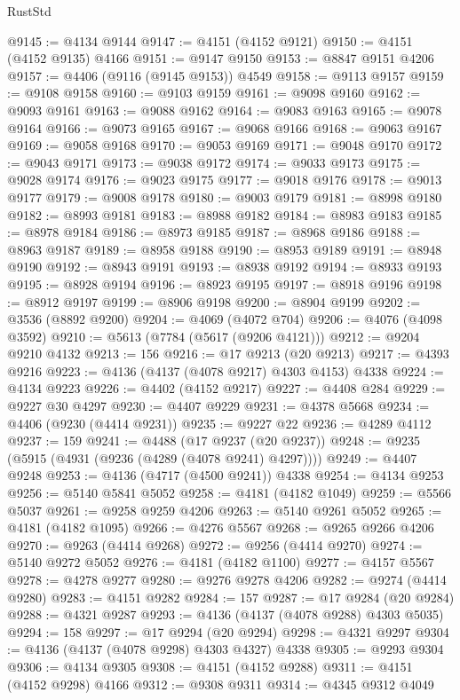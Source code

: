 \begin{lexlean}{RustStd}
\begin{coremodule}
@9145 := @4134 @9144
@9147 := @4151 (@4152 @9121)
@9150 := @4151 (@4152 @9135) @4166
@9151 := @9147 @9150
@9153 := @8847 @9151 @4206
@9157 := @4406 (@9116 (@9145 @9153)) @4549
@9158 := @9113 @9157
@9159 := @9108 @9158
@9160 := @9103 @9159
@9161 := @9098 @9160
@9162 := @9093 @9161
@9163 := @9088 @9162
@9164 := @9083 @9163
@9165 := @9078 @9164
@9166 := @9073 @9165
@9167 := @9068 @9166
@9168 := @9063 @9167
@9169 := @9058 @9168
@9170 := @9053 @9169
@9171 := @9048 @9170
@9172 := @9043 @9171
@9173 := @9038 @9172
@9174 := @9033 @9173
@9175 := @9028 @9174
@9176 := @9023 @9175
@9177 := @9018 @9176
@9178 := @9013 @9177
@9179 := @9008 @9178
@9180 := @9003 @9179
@9181 := @8998 @9180
@9182 := @8993 @9181
@9183 := @8988 @9182
@9184 := @8983 @9183
@9185 := @8978 @9184
@9186 := @8973 @9185
@9187 := @8968 @9186
@9188 := @8963 @9187
@9189 := @8958 @9188
@9190 := @8953 @9189
@9191 := @8948 @9190
@9192 := @8943 @9191
@9193 := @8938 @9192
@9194 := @8933 @9193
@9195 := @8928 @9194
@9196 := @8923 @9195
@9197 := @8918 @9196
@9198 := @8912 @9197
@9199 := @8906 @9198
@9200 := @8904 @9199
@9202 := @3536 (@8892 @9200)
@9204 := @4069 (@4072 @704)
@9206 := @4076 (@4098 @3592)
@9210 := @5613 (@7784 (@5617 (@9206 @4121)))
@9212 := @9204 @9210 @4132
@9213 := 156
@9216 := @17 @9213 (@20 @9213)
@9217 := @4393 @9216
@9223 := @4136 (@4137 (@4078 @9217) @4303 @4153) @4338
@9224 := @4134 @9223
@9226 := @4402 (@4152 @9217)
@9227 := @4408 @284
@9229 := @9227 @30 @4297
@9230 := @4407 @9229
@9231 := @4378 @5668
@9234 := @4406 (@9230 (@4414 @9231))
@9235 := @9227 @22
@9236 := @4289 @4112
@9237 := 159
@9241 := @4488 (@17 @9237 (@20 @9237))
@9248 := @9235 (@5915 (@4931 (@9236 (@4289 (@4078 @9241) @4297))))
@9249 := @4407 @9248
@9253 := @4136 (@4717 (@4500 @9241)) @4338
@9254 := @4134 @9253
@9256 := @5140 @5841 @5052
@9258 := @4181 (@4182 @1049)
@9259 := @5566 @5037
@9261 := @9258 @9259 @4206
@9263 := @5140 @9261 @5052
@9265 := @4181 (@4182 @1095)
@9266 := @4276 @5567
@9268 := @9265 @9266 @4206
@9270 := @9263 (@4414 @9268)
@9272 := @9256 (@4414 @9270)
@9274 := @5140 @9272 @5052
@9276 := @4181 (@4182 @1100)
@9277 := @4157 @5567
@9278 := @4278 @9277
@9280 := @9276 @9278 @4206
@9282 := @9274 (@4414 @9280)
@9283 := @4151 @9282
@9284 := 157
@9287 := @17 @9284 (@20 @9284)
@9288 := @4321 @9287
@9293 := @4136 (@4137 (@4078 @9288) @4303 @5035)
@9294 := 158
@9297 := @17 @9294 (@20 @9294)
@9298 := @4321 @9297
@9304 := @4136 (@4137 (@4078 @9298) @4303 @4327) @4338
@9305 := @9293 @9304
@9306 := @4134 @9305
@9308 := @4151 (@4152 @9288)
@9311 := @4151 (@4152 @9298) @4166
@9312 := @9308 @9311
@9314 := @4345 @9312 @4049

\end{coremodule}
\end{lexlean}
